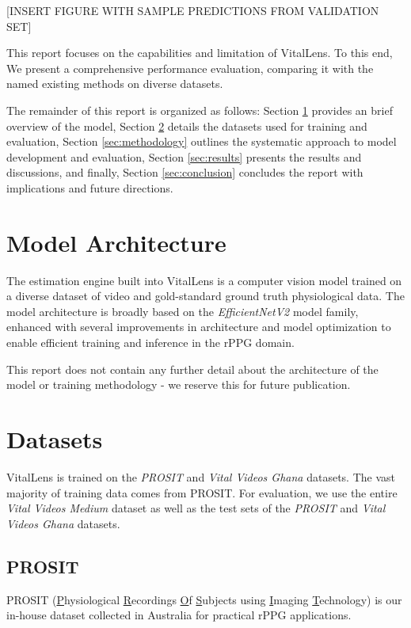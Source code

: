 \documentclass{article}
\begin{document}
[INSERT FIGURE WITH SAMPLE PREDICTIONS FROM VALIDATION SET]

This report focuses on the capabilities and limitation of VitalLens.
To this end, We present a comprehensive performance evaluation, comparing it with the named existing methods on diverse datasets.

The remainder of this report is organized as follows: Section \ref{sec:scope} provides an brief overview of the model, Section \ref{sec:datasets} details the datasets used for training and evaluation, Section \ref{sec:methodology} outlines the systematic approach to model development and evaluation, Section \ref{sec:results} presents the results and discussions, and finally, Section \ref{sec:conclusion} concludes the report with implications and future directions.

\section{Model Architecture}
\label{sec:scope}

The estimation engine built into VitalLens is a computer vision model trained on a diverse dataset of video and gold-standard ground truth physiological data.
The model architecture is broadly based on the \textit{EfficientNetV2} \cite{tan2021efficient} model family, enhanced with several improvements in architecture and model optimization to enable efficient training and inference in the rPPG domain.

This report does not contain any further detail about the architecture of the model or training methodology - we reserve this for future publication.

\section{Datasets}
\label{sec:datasets}

VitalLens is trained on the \textit{PROSIT} and \textit{Vital Videos Ghana} datasets.
The vast majority of training data comes from PROSIT.
For evaluation, we use the entire \textit{Vital Videos Medium} dataset as well as the test sets of the \textit{PROSIT} and \textit{Vital Videos Ghana} datasets.

\subsection{PROSIT}

PROSIT (\underline{P}hysiological \underline{R}ecordings \underline{O}f \underline{S}ubjects using \underline{I}maging \underline{T}echnology) is our in-house dataset collected in Australia for practical rPPG applications.
\end{document}
